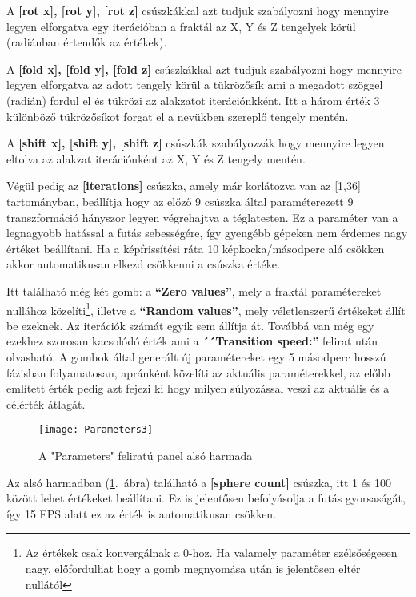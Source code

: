 A \textbf{[rot x], [rot y], [rot z]} csúszkákkal azt tudjuk szabályozni hogy mennyire legyen elforgatva egy iterációban a fraktál az X, Y és Z tengelyek körül (radiánban értendők az értékek). 

A \textbf{[fold x], [fold y], [fold z]} csúszkákkal azt tudjuk szabályozni hogy mennyire legyen elforgatva az adott tengely körül a tükrözősík  ami a megadott szöggel (radián) fordul el és tükrözi az alakzatot iterációnkként. Itt a három érték 3 különböző tükrözősíkot forgat el a nevükben szereplő tengely mentén. 

A \textbf{[shift x], [shift y], [shift z]} csúszkák szabályozzák hogy mennyire legyen eltolva az alakzat iterációnként az X, Y és Z tengely mentén.

Végül pedig az \textbf{[iterations]} csúszka, amely már korlátozva van az [1,36] tartományban, beállítja hogy az előző 9 csúszka által paraméterezett 9 transzformáció hányszor legyen végrehajtva a téglatesten. Ez a paraméter van a legnagyobb hatással a futás sebességére, így gyengébb gépeken nem érdemes nagy értéket beállítani. Ha a képfrissítési ráta 10 képkocka/másodperc alá csökken akkor automatikusan elkezd csökkenni a csúszka értéke.

Itt található még két gomb: a \textbf{``Zero values''}, mely a fraktál paramétereket nullához közelíti\footnote{Az értékek csak konvergálnak a 0-hoz. Ha valamely paraméter szélsőségesen nagy, előfordulhat hogy a gomb megnyomása után is jelentősen eltér nullától}, illetve a \textbf{``Random values''}, mely véletlenszerű értékeket állít be ezeknek. Az iterációk számát egyik sem állítja át. Továbbá van még egy ezekhez szorosan kacsolódó érték ami a \textbf{´´Transition speed:''} felirat után olvasható. A gombok által generált új paramétereket egy 5 másodperc hosszú fázisban folyamatosan, apránként közelíti az aktuális paraméterekkel, az előbb említett érték pedig azt fejezi ki hogy milyen súlyozással veszi az aktuális és a célérték átlagát.

\begin{figure}[H]
	\centering
	\texttt{[image: Parameters3]}
	\caption{A "Parameters" feliratú panel alsó harmada}
	\label{fig:Parameters3}
\end{figure}

Az alsó harmadban (\ref{fig:Parameters3}.~ábra) található a \textbf{[sphere count]} csúszka, itt 1 és 100 között lehet értékeket beállítani. Ez is jelentősen befolyásolja a futás gyorsaságát, így 15 FPS alatt ez az érték is automatikusan csökken.

